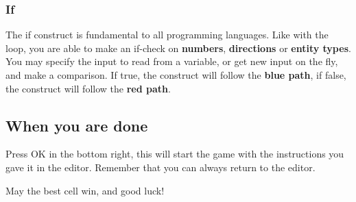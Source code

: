 \documentclass[12pt]{article}
\begin{document}
\subsubsection{If}

The if construct is fundamental to all programming languages. Like with the loop, you are able to make an if-check on \textbf{numbers}, \textbf{directions} or \textbf{entity types}. You may specify the input to read from a variable, or get new input on the fly, and make a comparison. If true, the construct will follow the \textbf{blue path}, if false, the construct will follow the \textbf{red path}.


\subsection{When you are done}

Press OK in the bottom right, this will start the game with the instructions you gave it in the editor. Remember that you can always return to the editor.


May the best cell win, and good luck!
\end{document}
